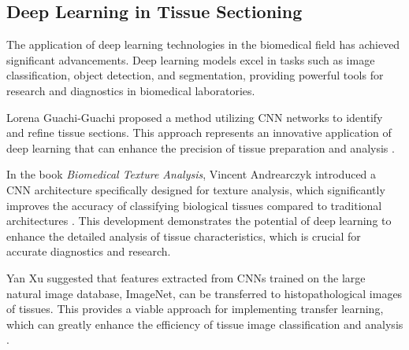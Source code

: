






\subsection{Deep Learning in Tissue Sectioning}

The application of deep learning technologies in the biomedical field has achieved significant advancements. Deep learning models excel in tasks such as image classification, object detection, and segmentation, providing powerful tools for research and diagnostics in biomedical laboratories.

Lorena Guachi-Guachi proposed a method utilizing CNN networks to identify and refine tissue sections. This approach represents an innovative application of deep learning that can enhance the precision of tissue preparation and analysis \cite{LR.7}.

In the book \textit{Biomedical Texture Analysis}, Vincent Andrearczyk introduced a CNN architecture specifically designed for texture analysis, which significantly improves the accuracy of classifying biological tissues compared to traditional architectures \cite{LR.8}. This development demonstrates the potential of deep learning to enhance the detailed analysis of tissue characteristics, which is crucial for accurate diagnostics and research.

Yan Xu suggested that features extracted from CNNs trained on the large natural image database, ImageNet, can be transferred to histopathological images of tissues. This provides a viable approach for implementing transfer learning, which can greatly enhance the efficiency of tissue image classification and analysis \cite{LR.9}.

